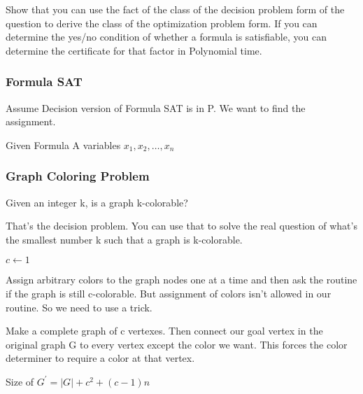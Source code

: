 \documentclass[english, 10pt]{article}
\begin{document}
Show that you can use the fact of the class of the decision problem form of the
question to derive the class of the optimization problem form.  If you can
determine the yes/no condition of whether a formula is satisfiable, you can
determine the certificate for that factor in Polynomial time.

\subsubsection{Formula SAT}
Assume Decision version of Formula SAT is in P. We want to find the assignment.

Given Formula A variables $x_1, x_2, \ldots , x_n$

\begin{algorithm}
    \;
\end{algorithm}

\subsubsection{Graph Coloring Problem}

Given an integer k, is a graph k-colorable?

That's the decision problem. You can use that to solve the real question of
what's the smallest number k such that a graph is k-colorable.

\begin{algorithm}[H]
    $c\gets 1$\;
\end{algorithm}

    Assign arbitrary colors to the graph nodes one at a time and then ask the
    routine if the graph is still c-colorable. But assignment of colors isn't
    allowed in our routine. So we need to use a trick.

    Make a complete graph of c vertexes. Then connect our goal vertex in the
    original graph G to every vertex except the color we want. This forces the
    color determiner to require a color at that vertex.

    Size of $G^{\prime} = |G|+ c^2 +(c-1)n$


\end{document}
